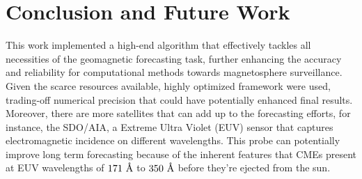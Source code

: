 \documentclass{article}
\begin{document}
\section{Conclusion and Future Work}
This work implemented a high-end algorithm that effectively tackles all necessities of the geomagnetic forecasting task, further enhancing the accuracy and reliability for computational methods towards magnetosphere surveillance. Given the scarce resources available, highly optimized framework were used, trading-off numerical precision that could have potentially enhanced final results. Moreover, there are more satellites that can add up to the forecasting efforts, for instance, the SDO/AIA, a Extreme Ultra Violet (EUV) sensor that captures electromagnetic incidence on different wavelengths. This probe can potentially improve long term forecasting because of the inherent features that CMEs present at EUV wavelengths of $171\textup{~\AA}$ to $350\textup{~\AA}$ before they're ejected from the sun.



\end{document}
